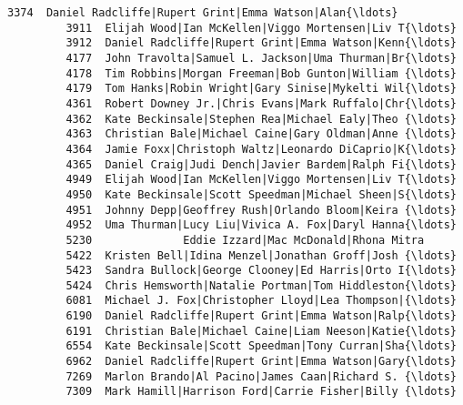 \documentclass[11pt]{article}
\begin{document}
\begin{Verbatim}[commandchars=\\\{\}]
         3374  Daniel Radcliffe|Rupert Grint|Emma Watson|Alan{\ldots}   
         3911  Elijah Wood|Ian McKellen|Viggo Mortensen|Liv T{\ldots}   
         3912  Daniel Radcliffe|Rupert Grint|Emma Watson|Kenn{\ldots}   
         4177  John Travolta|Samuel L. Jackson|Uma Thurman|Br{\ldots}   
         4178  Tim Robbins|Morgan Freeman|Bob Gunton|William {\ldots}   
         4179  Tom Hanks|Robin Wright|Gary Sinise|Mykelti Wil{\ldots}   
         4361  Robert Downey Jr.|Chris Evans|Mark Ruffalo|Chr{\ldots}   
         4362  Kate Beckinsale|Stephen Rea|Michael Ealy|Theo {\ldots}   
         4363  Christian Bale|Michael Caine|Gary Oldman|Anne {\ldots}   
         4364  Jamie Foxx|Christoph Waltz|Leonardo DiCaprio|K{\ldots}   
         4365  Daniel Craig|Judi Dench|Javier Bardem|Ralph Fi{\ldots}   
         4949  Elijah Wood|Ian McKellen|Viggo Mortensen|Liv T{\ldots}   
         4950  Kate Beckinsale|Scott Speedman|Michael Sheen|S{\ldots}   
         4951  Johnny Depp|Geoffrey Rush|Orlando Bloom|Keira {\ldots}   
         4952  Uma Thurman|Lucy Liu|Vivica A. Fox|Daryl Hanna{\ldots}   
         5230              Eddie Izzard|Mac McDonald|Rhona Mitra   
         5422  Kristen Bell|Idina Menzel|Jonathan Groff|Josh {\ldots}   
         5423  Sandra Bullock|George Clooney|Ed Harris|Orto I{\ldots}   
         5424  Chris Hemsworth|Natalie Portman|Tom Hiddleston{\ldots}   
         6081  Michael J. Fox|Christopher Lloyd|Lea Thompson|{\ldots}   
         6190  Daniel Radcliffe|Rupert Grint|Emma Watson|Ralp{\ldots}   
         6191  Christian Bale|Michael Caine|Liam Neeson|Katie{\ldots}   
         6554  Kate Beckinsale|Scott Speedman|Tony Curran|Sha{\ldots}   
         6962  Daniel Radcliffe|Rupert Grint|Emma Watson|Gary{\ldots}   
         7269  Marlon Brando|Al Pacino|James Caan|Richard S. {\ldots}   
         7309  Mark Hamill|Harrison Ford|Carrie Fisher|Billy {\ldots}   
         

\end{Verbatim}
\end{document}
